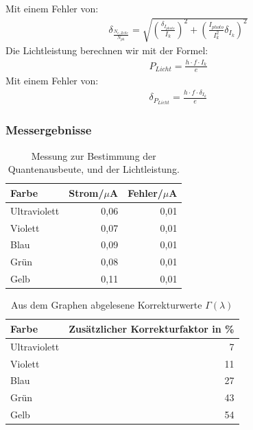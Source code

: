 \documentclass[12px]{scrartcl}
\begin{document}
Mit einem Fehler von:
\begin{align}
\delta_{\frac{N_{e,Zelle}}{N_{ph}}} = \sqrt{
\left(\frac{\delta_{I_{photo}}}{I_{k}}\right)^2+
\left(\frac{I_{photo}}{I_{k}^2}\delta_{I_{k}}\right)^2}
\end{align}
Die Lichtleistung berechnen wir mit der Formel:
\begin{align}
P_{Licht} = \frac{h\cdot f\cdot I_k}{e}
\label{eqn:p_l}
\end{align}
Mit einem Fehler von:
\begin{align}
\delta_{P_{Licht}} = \frac{h\cdot f\cdot \delta_{I_k}}{e}
\label{eqn:p_l_delta}
\end{align}

\subsubsection{Messergebnisse}
\begin{table}[H]
\caption{Messung zur Bestimmung der Quantenausbeute, und der Lichtleistung.}
\begin{center}
\begin{tabular}{|l|r|r|}
\hline
Farbe & \multicolumn{1}{l|}{Strom/$\mu$A} & \multicolumn{1}{l|}{Fehler/$\mu$A} \\ \hline
Ultraviolett & 0,06 & 0,01 \\ \hline
Violett & 0,07 & 0,01 \\ \hline
Blau & 0,09 & 0,01 \\ \hline
Grün & 0,08 & 0,01 \\ \hline
Gelb & 0,11 & 0,01 \\ \hline
\end{tabular}
\end{center}
\label{tab:a_2.3}
\end{table}

\begin{table}[H]
\caption{Aus dem Graphen abgelesene Korrekturwerte $\Gamma(\lambda)$}
\begin{center}
\begin{tabular}{|l|r|}
\hline
Farbe & \multicolumn{1}{l|}{Zusätzlicher Korrekturfaktor in \%} \\ \hline
Ultraviolett & 7 \\ \hline
Violett & 11 \\ \hline
Blau & 27 \\ \hline
Grün & 43 \\ \hline
Gelb & 54 \\ \hline
\end{tabular}
\end{center}
\label{tab:a_2_3_k}
\end{table}
\end{document}
